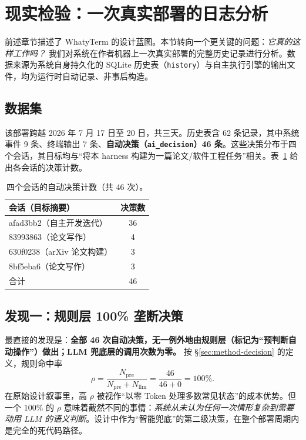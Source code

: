 \section{现实检验：一次真实部署的日志分析}
\label{sec:reality}

前述章节描述了 WhatyTerm 的设计蓝图。本节转向一个更关键的问题：\emph{它真的这样工作吗？} 我们对系统在作者机器上一次真实部署的完整历史记录进行分析。数据来源为系统自身持久化的 SQLite 历史表（\texttt{history}）与自主执行引擎的输出文件，均为运行时自动记录、非事后构造。

\subsection{数据集}

该部署跨越 2026 年 7 月 17 日至 20 日，共三天。历史表含 62 条记录，其中系统事件 9 条、终端输出 7 条、\textbf{自动决策（\texttt{ai\_decision}）46 条}。这些决策分布于四个会话，其目标均与“将本 harness 构建为一篇论文/软件工程任务”相关。表~\ref{tab:sessions} 给出各会话的决策计数。

\begin{table}[t]
  \centering\small
  \caption{四个会话的自动决策计数（共 46 次）。}
  \label{tab:sessions}
  \begin{tabular}{@{}lc@{}}
    \toprule
    会话（目标摘要） & 决策数 \\
    \midrule
    afad3bb2（自主开发迭代） & 36 \\
    83993863（论文写作） & 4 \\
    630f0238（arXiv 论文构建） & 3 \\
    8bf5eba6（论文写作） & 3 \\
    \midrule
    合计 & 46 \\
    \bottomrule
  \end{tabular}
\end{table}

\subsection{发现一：规则层 100\% 垄断决策}

最直接的发现是：\textbf{全部 46 次自动决策，无一例外地由规则层（标记为“预判断自动操作”）做出；LLM 兜底层的调用次数为零。} 按 \S\ref{sec:method-decision} 的定义，规则命中率
\[
\rho = \frac{N_{\text{pre}}}{N_{\text{pre}}+N_{\text{llm}}} = \frac{46}{46+0} = 100\%.
\]
在原始设计叙事里，高 $\rho$ 被视作“以零 Token 处理多数常见状态”的成本优势。但一个 $100\%$ 的 $\rho$ 意味着截然不同的事情：\emph{系统从未认为任何一次情形复杂到需要动用 LLM 的语义判断}。设计中作为“智能兜底”的第二级决策，在整个部署周期内是完全的死代码路径。

